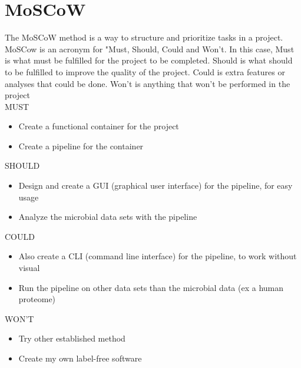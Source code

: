 \section{MoSCoW}

The MoSCoW method is a way to structure and prioritize tasks in a project. MoSCow is an acronym for "Must, Should, Could and Won't. In this case, Must is what must be fulfilled for the project to be completed. Should is what should to be fulfilled to improve the quality of the project. Could is extra features or analyses that could be done. Won't is anything that won't be performed in the project\\

{\Large MUST}
\begin{itemize}
  \item Create a functional container for the project
  \item Create a pipeline for the container
\end{itemize}

{\Large SHOULD}
\begin{itemize}
  \item Design and create a GUI (graphical user interface) for the pipeline, for easy usage
  \item Analyze the microbial data sets with the pipeline
\end{itemize}

{\Large COULD}
\begin{itemize}
  \item Also create a CLI (command line interface) for the pipeline, to work without visual
  \item Run the pipeline on other data sets than the microbial data (ex a human proteome)
\end{itemize}

{\Large WON'T}
\begin{itemize}
  \item Try other established method
  \item Create my own label-free software
\end{itemize}
